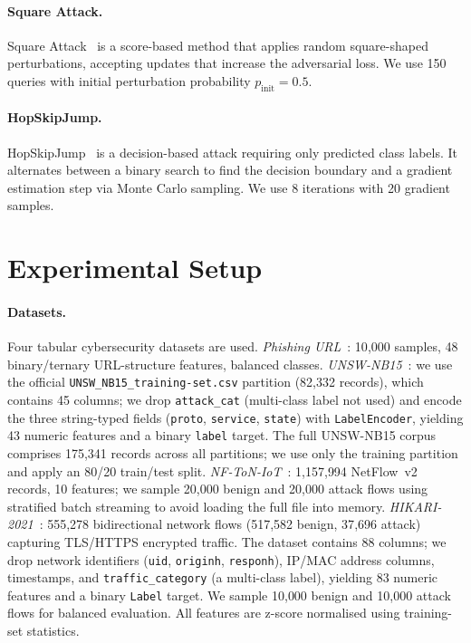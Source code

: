 \documentclass[runningheads]{llncs}
\begin{document}
\paragraph{Square Attack.}  Square Attack~\cite{andriushchenko2020square} is a
score-based method that applies random square-shaped perturbations, accepting
updates that increase the adversarial loss.  We use 150 queries with initial
perturbation probability $p_{\mathrm{init}} = 0.5$.

\paragraph{HopSkipJump.}  HopSkipJump~\cite{chen2020hopskipjump} is a
decision-based attack requiring only predicted class labels.  It alternates
between a binary search to find the decision boundary and a gradient estimation
step via Monte Carlo sampling.  We use 8 iterations with 20 gradient samples.

\section{Experimental Setup}
\label{sec:setup}

\paragraph{Datasets.}
Four tabular cybersecurity datasets are used.
\textit{Phishing URL}~\cite{phishing_kaggle}: 10{,}000 samples, 48 binary/ternary
URL-structure features, balanced classes.
\textit{UNSW-NB15}~\cite{moustafa2015unsw}: we use the official
\texttt{UNSW\_NB15\_training-set.csv} partition (82{,}332 records), which
contains 45 columns; we drop \texttt{attack\_cat} (multi-class label not used)
and encode the three string-typed fields (\texttt{proto}, \texttt{service},
\texttt{state}) with \texttt{LabelEncoder}, yielding 43 numeric features and a
binary \texttt{label} target.  The full UNSW-NB15 corpus comprises 175{,}341
records across all partitions; we use only the training partition and apply an
80/20 train/test split.
\textit{NF-ToN-IoT}~\cite{sarhan2021nftoniot}: 1{,}157{,}994 NetFlow~v2 records,
10 features; we sample 20{,}000 benign and 20{,}000 attack flows using stratified
batch streaming to avoid loading the full file into memory.
\textit{HIKARI-2021}~\cite{ferrag2022hikari}: 555{,}278 bidirectional network
flows (517{,}582 benign, 37{,}696 attack) capturing TLS/HTTPS encrypted traffic.
The dataset contains 88 columns; we drop network identifiers
(\texttt{uid}, \texttt{originh}, \texttt{responh}), IP/MAC address columns,
timestamps, and \texttt{traffic\_category} (a multi-class label), yielding
83 numeric features and a binary \texttt{Label} target.  We sample 10{,}000
benign and 10{,}000 attack flows for balanced evaluation.
All features are z-score normalised using training-set statistics.
\end{document}
